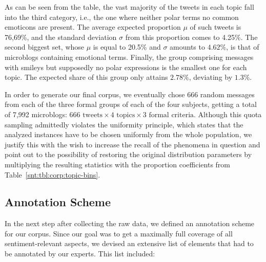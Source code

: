 As can be seen from the table, the vast majority of the tweets in each
topic fall into the third category, i.e., the one where neither polar
terms no common emoticons are present.  The average expected
proportion $\mu$ of such tweets is 76,69\%, and the standard deviation
$\sigma$ from this proportion comes to 4.25\%.  The second biggest
set, whose $\mu$ is equal to 20.5\% and $\sigma$ amounts to $4.62\%$,
is that of microblogs containing emotional terms.  Finally, the group
comprising messages with smileys but supposedly no polar expressions
is the smallest one for each topic.  The expected share of this group
only attains $2.78\%$, deviating by $1.3\%$.


In order to generate our final corpus, we eventually chose 666 random
messages from each of the three formal groups of each of the four
subjects, getting a total of 7,992 microblogs: $666\text{ tweets}
\times 4\text{ topics} \times 3\text{ formal criteria}$.  Although
this quota sampling admittedly violates the uniformity principle,
which states that the analyzed instances have to be chosen uniformly
from the whole population, we justify this with the wish to increase
the recall of the phenomena in question and point out to the
possibility of restoring the original distribution parameters by
multiplying the resulting statistics with the proportion coefficients
from Table~\ref{snt:tbl:corp:topic-bins}.

\subsection{Annotation Scheme}\label{subsec:snt:ascheme}
In the next step after collecting the raw data, we defined an
annotation scheme for our corpus. Since our goal was to get a
maximally full coverage of all sentiment-relevant aspects, we devised
an extensive list of elements that had to be annotated by our experts.
This list included:


